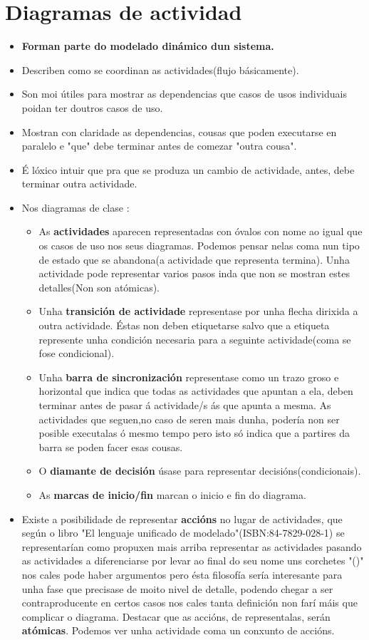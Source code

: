 \section{Diagramas de actividad}
	\begin{itemize}
		\item \textbf{Forman parte do modelado dinámico dun sistema.}
		\item Describen como se coordinan as actividades(flujo básicamente).
		\item Son moi útiles para mostrar as dependencias que casos de usos individuais poidan ter doutros casos de uso.
		\item Mostran con claridade as dependencias, cousas que poden executarse en paralelo e "que" debe terminar antes de comezar "outra cousa".
		\item É lóxico intuir que pra que se produza un cambio de actividade, antes, debe terminar outra actividade.
		\item Nos diagramas de clase :
		\begin{itemize}
			\item As \textbf{actividades} aparecen representadas con óvalos con nome ao igual que os casos de uso nos seus diagramas. Podemos pensar nelas coma nun tipo de estado que se abandona(a actividade que representa termina). Unha actividade pode representar varios pasos inda que non se mostran estes detalles(Non son atómicas).
			\item Unha \textbf{transición de actividade} representase por unha flecha dirixida a outra actividade. Éstas non deben etiquetarse salvo que a etiqueta represente unha condición necesaria para a seguinte actividade(coma se fose condicional).
			\item Unha \textbf{barra de sincronización} representase como un trazo groso e horizontal que indica que todas as actividades que apuntan a ela, deben terminar antes de pasar á actividade/s ás que apunta a mesma. As actividades que seguen,no caso de seren mais dunha, podería non ser posible executalas ó mesmo tempo pero isto só indica que a partires da barra se poden facer esas cousas.
			\item O \textbf{diamante de decisión} úsase para representar decisións(condicionais).
			\item As \textbf{marcas de inicio/fin} marcan o inicio e fin do diagrama.
		\end{itemize}
		\item Existe a posibilidade de representar \textbf{accións} no lugar de actividades, que según o libro "El lenguaje unificado de modelado"(ISBN:84-7829-028-1) se representarían como propuxen mais arriba representar as actividades pasando as actividades a diferenciarse por levar ao final do seu nome uns corchetes "()" nos cales pode haber argumentos pero ésta filosofía sería interesante para unha fase que precisase de moito nivel de detalle, podendo chegar a ser contraproducente en certos casos nos cales tanta definición non farí máis que complicar o diagrama. Destacar que as accións, de representalas, serán \textbf{atómicas}. Podemos ver unha actividade coma un conxunto de accións.

\end{itemize}
